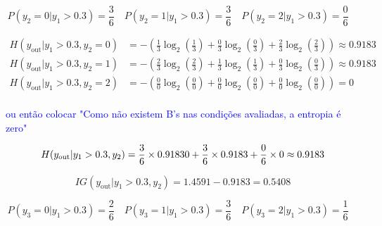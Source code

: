 \documentclass[12pt]{article}
\begin{document}
\begin{enumerate}[leftmargin=\labelsep]
\vspace{0.5cm}
\quad{}

\begin{equation*}
    P(y_2 = 0 | y_1 > 0.3) = \frac{3}{6} \quad
    P(y_2 = 1 | y_1 > 0.3) = \frac{3}{6} \quad
    P(y_2 = 2 | y_1 > 0.3) = \frac{0}{6} \quad
\end{equation*}

\begin{equation*}
    \begin{aligned}
        H(y_{\text{out}} | y_1 > 0.3, y_2 = 0) &= - \left( \frac{1}{3} \log_2 \left( \frac{1}{3} \right) + \frac{0}{3} \log_2 \left( \frac{0}{3} \right) + \frac{2}{3} \log_2 \left( \frac{2}{3} \right) \right) \approx 0.9183
        \\
        H(y_{\text{out}} | y_1 > 0.3, y_2 = 1) &= - \left( \frac{2}{3} \log_2 \left( \frac{2}{3} \right) + \frac{1}{3} \log_2 \left( \frac{1}{3} \right) + \frac{0}{3} \log_2 \left( \frac{0}{3} \right) \right) \approx 0.9183
        \\
        H(y_{\text{out}} | y_1 > 0.3, y_2 = 2) &= - \left( \frac{0}{0} \log_2 \left( \frac{0}{0} \right) + \frac{0}{0} \log_2 \left( \frac{0}{0} \right) + \frac{0}{0} \log_2 \left( \frac{0}{0} \right) \right) = 0
        \\
    \end{aligned}
\end{equation*}

\textcolor{blue}{ou então colocar "Como não existem B's nas condições avaliadas, a entropia é zero"}

\begin{equation*}
    H(y_{\text{out}} | y_1 > 0.3, y_2) = \frac{3}{6} \times 0.91830 + \frac{3}{6} \times 0.9183 + \frac{0}{6} \times 0 \approx 0.9183
    \\
\end{equation*}

\begin{equation*}
    IG(y_{\text{out}} | y_1 > 0.3, y_2) = 1.4591 - 0.9183 = 0.5408
\end{equation*}

\newpage


\begin{equation*}
    P(y_3 = 0|y_1 > 0.3) = \frac{2}{6} \quad
    P(y_3 = 1|y_1 > 0.3) = \frac{3}{6} \quad
    P(y_3 = 2|y_1 > 0.3) = \frac{1}{6} \quad
\end{equation*}


\end{enumerate}
\end{document}
